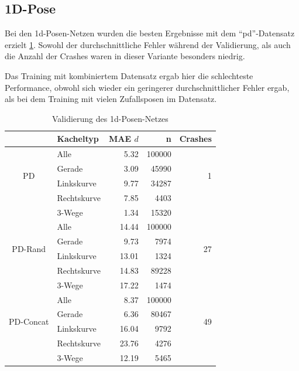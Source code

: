 \subsection{1D-Pose}

Bei den \acs{1d}-Posen-Netzen wurden die besten Ergebnisse mit dem ``\acs{pd}''-Datensatz erzielt \ref{1d-validation}. Sowohl der durchschnittliche Fehler während der Validierung, als auch die Anzahl der Crashes waren in dieser Variante besonders niedrig.

Das Training mit kombiniertem Datensatz ergab hier die schlechteste Performance, obwohl sich wieder ein geringerer durchschnittlicher Fehler ergab, als bei dem Training mit vielen Zufallsposen im Datensatz.

\begin{table}[H]
	\centering
	\begin{tabular}[t]{|c|l|r|r|r|}
		\hline
		& \textbf{Kacheltyp} & \textbf{MAE $d$} & \textbf{n} & Crashes \\
		\hline
		\multirow{4}{*}{PD} 
		& Alle
		& 5.32
		& 100000
		& \multirow{4}{*}{1}\\
		\cline{2-4}
		& Gerade
		&  3.09
		& 45990
		&\\
		\cline{2-4}
		& Linkskurve
		& 9.77
		& 34287
		&\\
		\cline{2-4}
		& Rechtskurve
		& 7.85
		& 4403
		&\\
		\cline{2-4}
		& 3-Wege
		&  1.34
		& 15320
		&\\
		\hline
		\multirow{4}{*}{PD-Rand} 
		& Alle
		& 14.44
		& 100000
		& \multirow{4}{*}{27}\\
		\cline{2-4}
		& Gerade
		&  9.73
		& 7974
		& \\
		\cline{2-4}
		& Linkskurve
		& 13.01
		& 1324
		&\\
		\cline{2-4}
		& Rechtskurve
		& 14.83
		& 89228
		&\\
		\cline{2-4}
		& 3-Wege
		& 17.22
		& 1474
		&\\
		\hline
		\multirow{4}{*}{PD-Concat} 
		& Alle
		& 8.37
		& 100000
		& \multirow{4}{*}{49}\\
		\cline{2-4}
		& Gerade
		& 6.36
		& 80467
		&\\
		\cline{2-4}
		& Linkskurve
		& 16.04
		& 9792
		&\\
		\cline{2-4}
		& Rechtskurve
		& 23.76
		& 4276
		&\\
		\cline{2-4}
		& 3-Wege
		& 12.19
		& 5465
		&\\
		\hline
	\end{tabular}
	\caption{Validierung des \acs{1d}-Posen-Netzes}
	\label{1d-validation}
\end{table}

